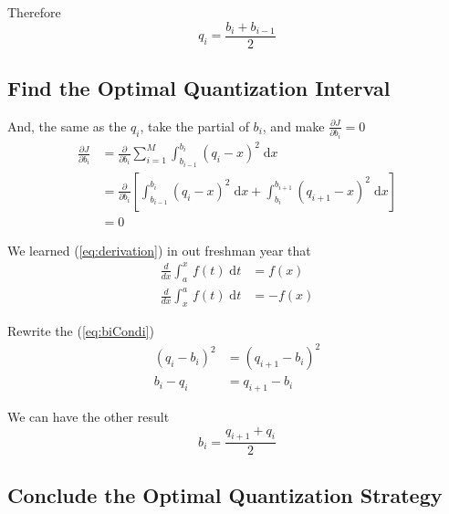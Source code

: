 \documentclass{article}
\begin{document}
Therefore
\begin{equation}
	q_i = \frac{b_i + b_{i - 1}}{2} 
	\label{eq:qiResult}
\end{equation}

\subsection{Find the Optimal Quantization Interval}

And, the same as the $q_i$, take the partial of $b_i$, and make $\frac{\partial J}{\partial b_i} = 0$
\begin{equation*}
	\begin{aligned}
		\frac{\partial J}{\partial b_i} &= \frac{\partial}{\partial b_i} \sum_{i = 1}^{M} \int_{b_{i - 1}}^{b_i} (q_i - x)^2 \; \mathrm{d}x \\ 
		&= \frac{\partial}{\partial b_i} [\int_{b_{i - 1}}^{b_i} (q_i - x)^2 \; \mathrm{d}x + \int_{b_{i}}^{b_{i + 1}} (q_{i + 1} - x)^2 \; \mathrm{d}x] \\ 
		&= 0
	\end{aligned}
	\label{eq:biCondi}
\end{equation*}

We learned (\ref{eq:derivation}) in out freshman year that
\begin{equation}
\begin{aligned}
	\frac{d}{dx} \int_{a}^{x} \, f(t) \; \mathrm{d}t &= f(x) \\ 
	\frac{d}{dx} \int_{x}^{a} \, f(t) \; \mathrm{d}t &= - f(x)
\end{aligned}
\label{eq:derivation}
\end{equation}

Rewrite the (\ref{eq:biCondi})
\begin{equation*}
	\begin{aligned}
		(q_i - b_i)^2 &= (q_{i + 1} - b_i)^2 \\ 
		b_i - q_i &= q_{i + 1} - b_i
	\end{aligned}
\end{equation*}

We can have the other result
\begin{equation}
	b_i = \frac{q_{i + 1} + q_i}{2}
	\label{eq:biResult}
\end{equation}

\subsection{Conclude the Optimal Quantization Strategy}
\end{document}
